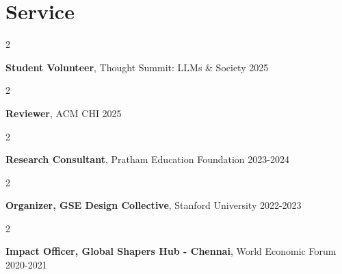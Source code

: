 \documentclass[10pt, letterpaper]{article}
\newenvironment{twocolentry}[2][]{
    \onecolentry
    \def\secondColumn{#2}
    \setcolumnwidth{\fill, 4.5 cm}
    \begin{paracol}{2}
}{
    \switchcolumn \raggedleft \secondColumn
    \end{paracol}
    \endonecolentry
} %
\newcommand{\datetext}[1]{\color{gray800}#1}
\newcommand{\serviceentry}[3]{
    \begin{twocolentry}{
        \datetext{#3}
    }
        \textbf{#1}, #2\end{twocolentry}

    \vspace{0.10 cm}
}
\begin{document}
    \section{Service}
        \serviceentry{Student Volunteer}{Thought Summit: LLMs \& Society}{2025}
        \serviceentry{Reviewer}{ACM CHI}{2025}
        \serviceentry{Research Consultant}{Pratham Education Foundation}{2023-2024}
        \serviceentry{Organizer, GSE Design Collective}{Stanford University}{2022-2023}
        \serviceentry{Impact Officer, Global Shapers Hub - Chennai}{World Economic Forum}{2020-2021}  


    


    
\end{document}

